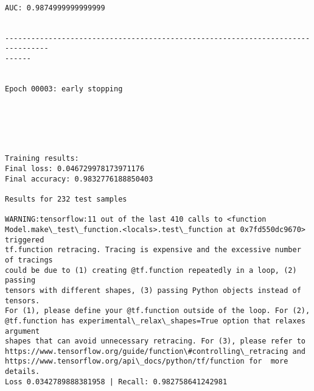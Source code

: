 \documentclass[11pt]{article}
\begin{document}
    \begin{center}
    \end{center}
    { \hspace*{\fill} \\}
    
    \begin{Verbatim}[commandchars=\\\{\}]
AUC: 0.9874999999999999


--------------------------------------------------------------------------------
------


Epoch 00003: early stopping
    \end{Verbatim}

    \begin{center}
    \end{center}
    { \hspace*{\fill} \\}
    
    \begin{center}
    \end{center}
    { \hspace*{\fill} \\}
    
    \begin{Verbatim}[commandchars=\\\{\}]

Training results:
Final loss: 0.046729978173971176
Final accuracy: 0.9832776188850403

Results for 232 test samples

WARNING:tensorflow:11 out of the last 410 calls to <function
Model.make\_test\_function.<locals>.test\_function at 0x7fd550dc9670> triggered
tf.function retracing. Tracing is expensive and the excessive number of tracings
could be due to (1) creating @tf.function repeatedly in a loop, (2) passing
tensors with different shapes, (3) passing Python objects instead of tensors.
For (1), please define your @tf.function outside of the loop. For (2),
@tf.function has experimental\_relax\_shapes=True option that relaxes argument
shapes that can avoid unnecessary retracing. For (3), please refer to
https://www.tensorflow.org/guide/function\#controlling\_retracing and
https://www.tensorflow.org/api\_docs/python/tf/function for  more details.
Loss 0.0342789888381958 | Recall: 0.982758641242981



    \end{Verbatim}
\end{document}
